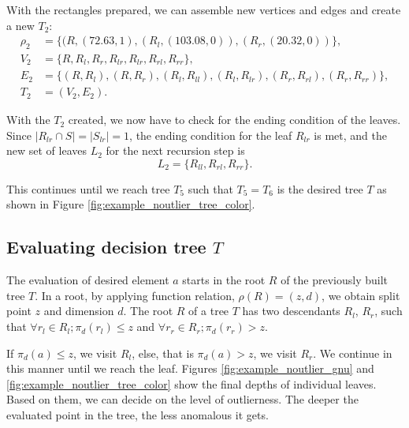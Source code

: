 \begin{example}
With the rectangles prepared, we can assemble new vertices and edges and create a new $T_2$:
\begin{align*}
\rho_2 &= \{(R,(72.63,1), (R_l, (103.08, 0)), (R_r, (20.32, 0)) \},\\
V_2 &= \{ R, R_l, R_r, R_{lr}, R_{lr}, R_{rl}, R_{rr} \},\\
E_2 &= \{ (R,R_l),(R,R_r), (R_l,R_{ll}), (R_l,R_{lr}), (R_r,R_{rl}), (R_r,R_{rr}) \},\\
T_2 &= (V_2, E_2).
\end{align*}

With the $T_2$ created, we now have to check for the ending condition of the leaves. Since $|R_{lr}\cap S|=|S_{lr}| = 1$, the ending condition for the leaf $R_{lr}$ is met, and the new set of leaves $L_2$ for the next recursion step is
$$L_2 = \{R_{ll},R_{rl},R_{rr}\}.$$

This continues until we reach tree $T_5$ such that $T_5=T_6$ is the desired tree $T$ as shown in Figure \ref{fig:example_noutlier_tree_color}. 
\end{example}


\subsection{Evaluating decision tree $T$}
The evaluation of desired element $a$ starts in the root $R$ of the previously built tree $T$.
In a root, by applying function relation, $\rho(R) = (z,d)$, we obtain split point $z$ and dimension $d$.
The root $R$ of a tree $T$ has two descendants $R_l$, $R_r$, such that
$\forall r_l\in R_l; \pi_d(r_l) \le z$ and $\forall r_r\in R_r; \pi_d(r_r)  > z$.

If $\pi_d(a)\le z$, we visit $R_l$, else, that is $\pi_d(a) > z$, we visit $R_r$.
We continue in this manner until we reach the leaf. Figures \ref{fig:example_noutlier_gnu} and \ref{fig:example_noutlier_tree_color} show the final depths of individual leaves. Based on them, we can decide on the level of outlierness. The deeper the evaluated point in the tree, the less anomalous it gets.

